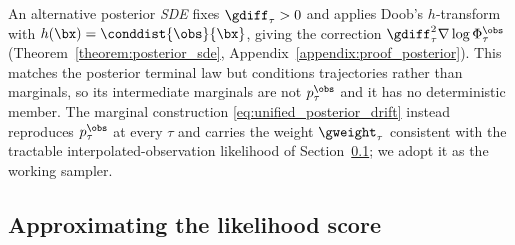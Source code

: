 \begin{remark}\label{rem:doob}
An alternative posterior \emph{SDE} fixes $\gdiff_\tau>0$ and applies Doob's $h$-transform with $h(\bx)=\conddist{\obs}{\bx}$, giving the correction $\gdiff_\tau^2\nabla\log\Phi_\tau^{\obs}$ (Theorem~\ref{theorem:posterior_sde}, Appendix~\ref{appendix:proof_posterior}). This matches the posterior terminal law but conditions trajectories rather than marginals, so its intermediate marginals are not $p_\tau^{\obs}$ and it has no deterministic member. The marginal construction \eqref{eq:unified_posterior_drift} instead reproduces $p_\tau^{\obs}$ at every $\tau$ and carries the weight $\gweight_\tau$ consistent with the tractable interpolated-observation likelihood of Section~\ref{subsec:obs_interpolation}; we adopt it as the working sampler.
\end{remark}

\subsection{Approximating the likelihood score}
\label{subsec:obs_interpolation}

